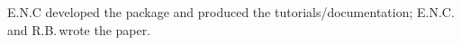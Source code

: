 \documentclass[codesnippet]{jss}
\begin{document}
E.N.C developed the  package and produced the tutorials/documentation; E.N.C.\,and R.B.\,wrote the paper.




\newpage

\end{document}
